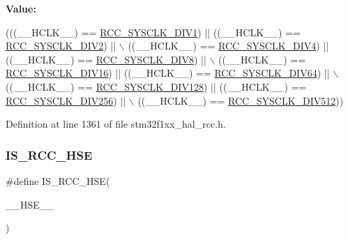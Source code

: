 {\bfseries Value\+:}
\begin{DoxyCode}
(((\_\_HCLK\_\_) == \hyperlink{group___r_c_c___a_h_b___clock___source_ga226f5bf675015ea677868132b6b83494}{RCC\_SYSCLK\_DIV1}) || ((\_\_HCLK\_\_) == 
      \hyperlink{group___r_c_c___a_h_b___clock___source_gac37c0610458a92e3cb32ec81014625c3}{RCC\_SYSCLK\_DIV2}) || \(\backslash\)
                               ((\_\_HCLK\_\_) == \hyperlink{group___r_c_c___a_h_b___clock___source_ga6fd3652d6853563cdf388a4386b9d22f}{RCC\_SYSCLK\_DIV4}) || ((\_\_HCLK\_\_) == 
      \hyperlink{group___r_c_c___a_h_b___clock___source_ga7def31373854ba9c72bb76b1d13e3aad}{RCC\_SYSCLK\_DIV8}) || \(\backslash\)
                               ((\_\_HCLK\_\_) == \hyperlink{group___r_c_c___a_h_b___clock___source_ga895462b261e03eade3d0139cc1327a51}{RCC\_SYSCLK\_DIV16}) || ((\_\_HCLK\_\_) == 
      \hyperlink{group___r_c_c___a_h_b___clock___source_ga73814b5a7ee000687ec8334637ca5b14}{RCC\_SYSCLK\_DIV64}) || \(\backslash\)
                               ((\_\_HCLK\_\_) == \hyperlink{group___r_c_c___a_h_b___clock___source_ga43eddf4d4160df30548a714dce102ad8}{RCC\_SYSCLK\_DIV128}) || ((\_\_HCLK\_\_) == 
      \hyperlink{group___r_c_c___a_h_b___clock___source_ga94956d6e9c3a78230bf660b838f987e2}{RCC\_SYSCLK\_DIV256}) || \(\backslash\)
                               ((\_\_HCLK\_\_) == \hyperlink{group___r_c_c___a_h_b___clock___source_gabe18a9d55c0858bbfe3db657fb64c76d}{RCC\_SYSCLK\_DIV512}))
\end{DoxyCode}


Definition at line 1361 of file stm32f1xx\+\_\+hal\+\_\+rcc.\+h.

\mbox{\label{group___r_c_c___private___macros_ga3c9bb7f31e4cd8436a41ae33c8908226}} 
\subsubsection{\texorpdfstring{I\+S\+\_\+\+R\+C\+C\+\_\+\+H\+SE}{IS\_RCC\_HSE}}
{\footnotesize\ttfamily \#define I\+S\+\_\+\+R\+C\+C\+\_\+\+H\+SE(\begin{DoxyParamCaption}\item[{}]{\+\_\+\+\_\+\+H\+S\+E\+\_\+\+\_\+ }\end{DoxyParamCaption})}

